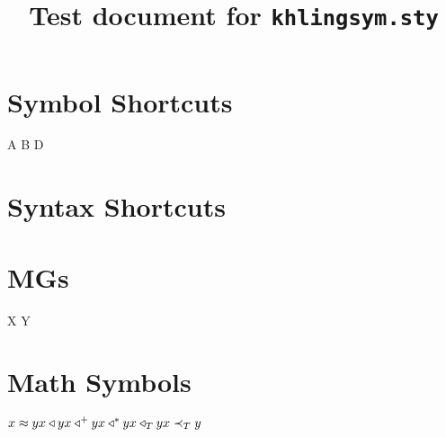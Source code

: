 \documentclass{kharticle}
\title{Test document for \texttt{khlingsym.sty}}
\begin{document}
\maketitle

\section{Symbol Shortcuts}

\begin{examplebox}
\larrow \rarrow \lrarrow \par
\emptystr \zero \par
\chkmark \xmark \par
\ledge \redge \tedge \bedge \slot \par
A B \gap D \par
{} \par
{} \par
\end{examplebox}

\section{Syntax Shortcuts}

\begin{examplebox}
\emptyD \emptyT \par
\lv \lvb \lvp \par
\Tpast \Tpres
\end{examplebox}

\section{MGs}

\begin{examplebox}
 \par
{} \par
{} \par
X \mergedot Y \par
\end{examplebox}

\section{Math Symbols}

\begin{examplebox}
\begin{math}
x \approx y \\
x \triangleleft y \\
x \triangleleft^+ y \\
x \triangleleft^* y \\
x \triangleleft_T y \\
x \prec_T y
\end{math}
\end{examplebox}
\end{document}
